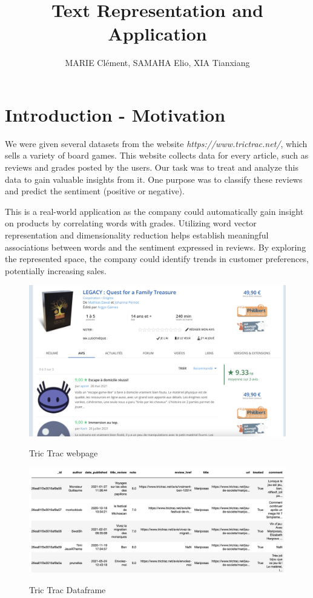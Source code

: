 \documentclass{article}
\title{Text Representation and Application}
\author{MARIE Clément, SAMAHA Elio, XIA Tianxiang}
\begin{document}
\maketitle
\tableofcontents
\newpage
\section{Introduction - Motivation}
We were given several datasets from the website \textit{https://www.trictrac.net/}, which sells a variety of board games. This website collects data for every article, such as reviews and grades posted by the users. Our task was to treat and analyze this data to gain valuable insights from it. One purpose was to classify these reviews and predict the sentiment (positive or negative).

This is a real-world application as the company could automatically gain insight on products by correlating words with grades. Utilizing word vector representation and dimensionality reduction helps establish meaningful associations between words and the sentiment expressed in reviews. By exploring the represented space, the company could identify trends in customer preferences, potentially increasing sales.

\begin{figure}[H]
  \centering
  \begin{minipage}[t]{0.8\linewidth}
    \centering
    \includegraphics[width=0.8\linewidth]{tric_trac_pic.png}
    \caption{Tric Trac webpage}
    \vspace{0.5cm}
    \label{fig:tric_trac_webpage}
  \end{minipage}
  
  \begin{minipage}[t]{0.8\linewidth}
    \centering
    \includegraphics[width=1.2\linewidth]{tric_trac_df.png}
    \caption{Tric Trac Dataframe}
    \vspace{0.5cm}
    \label{fig:tric_trac_dataframe}
  \end{minipage}
\end{figure}
\end{document}
